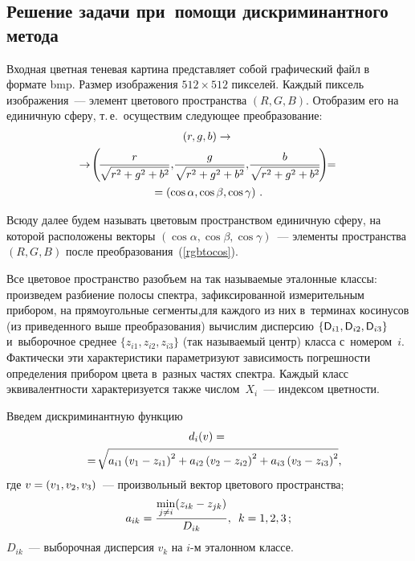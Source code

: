 \begin{multicols}{2}
\subsection{Решение задачи при~помощи дискриминантного метода}

Входная цветная теневая картина представляет собой графический файл
в формате bmp. Размер изображения $512 \times 512$ пикселей. Каждый
пиксель изображения~--- элемент цветового пространства $(R, G, B)$.
Отобразим его на единичную сферу, т.\,е.\ осуществим следующее
преобразование:
{ %
\begin{multline}
(r,g,b)\to{}\\
\!\to\!\left(\!\fr{r}{\sqrt{r^2+g^2+b^2}},\!\fr{g}{\sqrt{r^2+g^2+b^2}},\!
\fr{b}{\sqrt{r^2+g^2+b^2}}\!\right)\!\!=\\
\label{rgbtocos}
=\left(\cos{\alpha},\cos{\beta},\cos{\gamma}\right)\,.
\end{multline}
}

Всюду далее будем называть цветовым пространством единичную сферу, 
на которой расположены векторы
$\left(\cos{\alpha},\cos{\beta},\cos{\gamma}\right)$~--- элементы 
пространства $(R, G, B)$ после преобразования~(\ref{rgbtocos}).

Все цветовое пространство разобъем на так называемые эталонные классы:
произведем разби\-ение полосы спектра, зафиксированной измерительным
прибором, на прямоугольные сегменты,\linebreak для каждого из них в~терминах
косинусов (из приведенного выше преобразования) вычислим дисперсию
$\{{\sf D}_{i1},{\sf D}_{i2},{\sf D}_{i3}\}$ и~выборочное среднее
$\{z_{i1},z_{i2},z_{i3}\}$ (так называемый центр) класса с~номером~$i$.
Фактически эти характеристики параметризуют зависимость погрешности
определения прибором цвета в~разных частях спектра. Каждый класс
эквивалентности характеризуется также чис\-лом~$X_{i}$~--- индексом
цветности.

Введем дискриминантную функцию
\begin{multline*}
    d_{i}(v)={}\\
    {}=\!\sqrt{a_{i1}\left(v_1-z_{i1}\right)^2+a_{i2}\left(v_2-z_{i2}\right)^2+
    a_{i3}\left(v_3-z_{i3}\right)^2},\hspace*{-7.9pt}
\end{multline*}
где
$v\hm=(v_1,v_2,v_3)$~--- произвольный вектор цветового пространства;
$$
a_{ik}=\fr{\min_{j \neq i}(z_{ik}-z_{jk})}{D_{ik}},\enskip k\hm=1,2,3\,;$$
$D_{ik}$~--- выборочная дисперсия $v_k$ на $i$-м эталонном классе.



\end{multicols}
